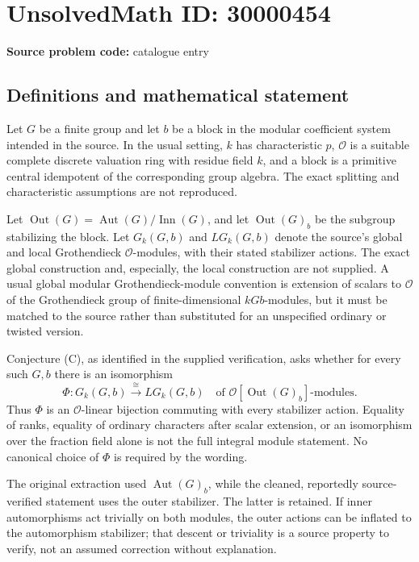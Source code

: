 \documentclass[11pt]{article}
\begin{document}
\section*{UnsolvedMath ID: 30000454}
\textbf{Source problem code:} catalogue entry
\subsection{Definitions and mathematical statement}
Let \(G\) be a finite group and let \(b\) be a block in the modular coefficient system intended in the source. In the usual setting, \(k\) has characteristic \(p\), \(\mathcal O\) is a suitable complete discrete valuation ring with residue field \(k\), and a block is a primitive central idempotent of the corresponding group algebra. The exact splitting and characteristic assumptions are not reproduced.

Let \(\operatorname{Out}(G)=\operatorname{Aut}(G)/\operatorname{Inn}(G)\), and let \(\operatorname{Out}(G)_b\) be the subgroup stabilizing the block. Let \(G_k(G,b)\) and \(LG_k(G,b)\) denote the source's global and local Grothendieck \(\mathcal O\)-modules, with their stated stabilizer actions. The exact global construction and, especially, the local construction are not supplied. A usual global modular Grothendieck-module convention is extension of scalars to \(\mathcal O\) of the Grothendieck group of finite-dimensional \(kGb\)-modules, but it must be matched to the source rather than substituted for an unspecified ordinary or twisted version.

Conjecture (C), as identified in the supplied verification, asks whether for every such \(G,b\) there is an isomorphism
\[
\Phi:G_k(G,b)\xrightarrow{\ \cong\ }LG_k(G,b)
\quad\text{of }\mathcal O[\operatorname{Out}(G)_b]\text{-modules}.
\]
Thus \(\Phi\) is an \(\mathcal O\)-linear bijection commuting with every stabilizer action. Equality of ranks, equality of ordinary characters after scalar extension, or an isomorphism over the fraction field alone is not the full integral module statement. No canonical choice of \(\Phi\) is required by the wording.

The original extraction used \(\operatorname{Aut}(G)_b\), while the cleaned, reportedly source-verified statement uses the outer stabilizer. The latter is retained. If inner automorphisms act trivially on both modules, the outer actions can be inflated to the automorphism stabilizer; that descent or triviality is a source property to verify, not an assumed correction without explanation.
\end{document}
